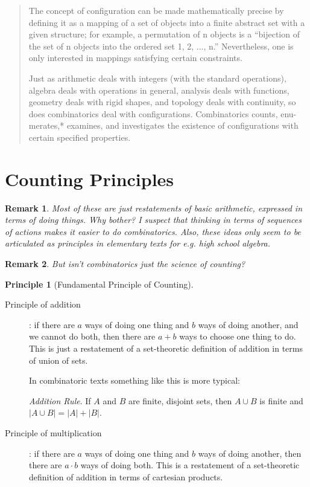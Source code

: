 \documentclass[reqno,12pt]{tufte-book}
\numberwithin{equation}{subsection}
\newtheorem{principle}{Principle}
\newtheorem{remark}{Remark}
\begin{document}
\blockquote{The concept of configuration can be made mathematically precise by defining it as a mapping of a set of objects into a finite abstract set with a given structure; for example, a permutation of n objects is a “bijection of the set of n objects into the ordered set 1, 2, ..., n.” Nevertheless, one is only interested in mappings satisfying certain constraints.

Just as arithmetic deals with integers (with the standard operations), algebra deals with operations in general, analysis deals with functions, geometry deals with rigid shapes, and topology deals with continuity, so does combinatorics deal with configurations. Combinatorics counts, enu- merates,* examines, and investigates the existence of configurations with certain specified properties.
}

\section{Counting Principles}

\begin{remark}
  Most of these are just restatements of basic arithmetic, expressed
  in terms of doing things.  Why bother?  I suspect that thinking in
  terms of sequences of actions makes it easier to do combinatorics.
  Also, these ideas only seem to be articulated as principles in
  elementary texts for e.g. high school algebra.
\end{remark}

\begin{remark}
  But isn't combinatorics just the science of counting?
\end{remark}

\begin{principle}[Fundamental Principle of Counting]

\end{principle}

\begin{description}
\item [Principle of addition]: if there are $a$ ways of doing one thing
  and $b$ ways of doing another, and we cannot do both, then there are
  $a+b$ ways to choose one thing to do.  This is just a restatement of
  a set-theoretic definition of addition in terms of union of sets.

  In combinatoric texts something like this is more typical:

  \textit{Addition Rule}. If $A$ and $B$ are finite, disjoint sets,
  then $A \cup B$ is finite and $|A \cup B| = |A| + |B|$.

\item [Principle of multiplication]: if there are $a$ ways of doing
  one thing and $b$ ways of doing another, then there are $a\cdot b$
  ways of doing both.  This is a restatement of a set-theoretic
  definition of addition in terms of cartesian products.
\end{description}
\end{document}
